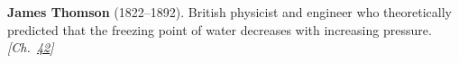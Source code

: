 \textbf{James Thomson} (1822–1892). British physicist and engineer who theoretically predicted that the freezing point of water decreases with increasing pressure. \emph{[Ch.~\hyperref[ch:iceslipperiness]{42}]}


